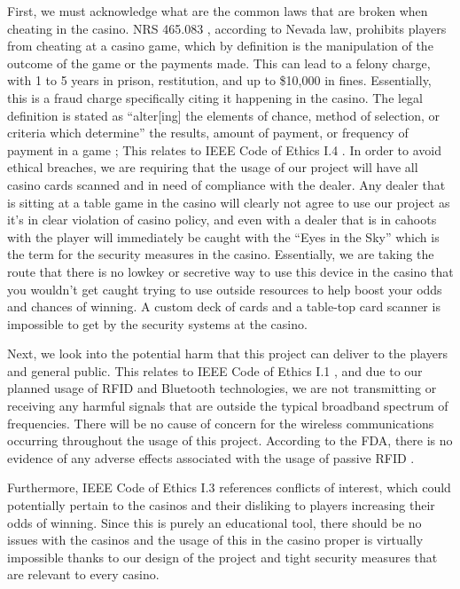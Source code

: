 \documentclass[12pt]{article}
\begin{document}
First, we must acknowledge what are the common laws that are broken when cheating in the casino. NRS 465.083 \cite{NRS}, according to Nevada law, prohibits players from cheating at a casino game, which by definition is the manipulation of the outcome of the game or the payments made. This can lead to a felony charge, with 1 to 5 years in prison, restitution, and up to \$10,000 in fines. Essentially, this is a fraud charge specifically citing it happening in the casino. The legal definition is stated as ``alter[ing] the elements of chance, method of selection, or criteria which determine'' the results, amount of payment, or frequency of payment in a game \cite{NRS}; This relates to IEEE Code of Ethics I.4 \cite{IEEE_ethics}. In order to avoid ethical breaches, we are requiring that the usage of our project will have all casino cards scanned and in need of compliance with the dealer. Any dealer that is sitting at a table game in the casino will clearly not agree to use our project as it's in clear violation of casino policy, and even with a dealer that is in cahoots with the player will immediately be caught with the ``Eyes in the Sky'' which is the term for the security measures in the casino. Essentially, we are taking the route that there is no lowkey or secretive way to use this device in the casino that you wouldn't get caught trying to use outside resources to help boost your odds and chances of winning. A custom deck of cards and a table-top card scanner is impossible to get by the security systems at the casino. 

Next, we look into the potential harm that this project can deliver to the players and general public. This relates to IEEE Code of Ethics I.1 \cite{IEEE_ethics}, and due to our planned usage of RFID and Bluetooth technologies, we are not transmitting or receiving any harmful signals that are outside the typical broadband spectrum of frequencies. There will be no cause of concern for the wireless communications occurring throughout the usage of this project. According to the FDA, there is no evidence of any adverse effects associated with the usage of passive RFID \cite{FDA_RFID}.

Furthermore, IEEE Code of Ethics I.3 \cite{IEEE_ethics} references conflicts of interest, which could potentially pertain to the casinos and their disliking to players increasing their odds of winning. Since this is purely an educational tool, there should be no issues with the casinos and the usage of this in the casino proper is virtually impossible thanks to our design of the project and tight security measures that are relevant to every casino.
\end{document}
